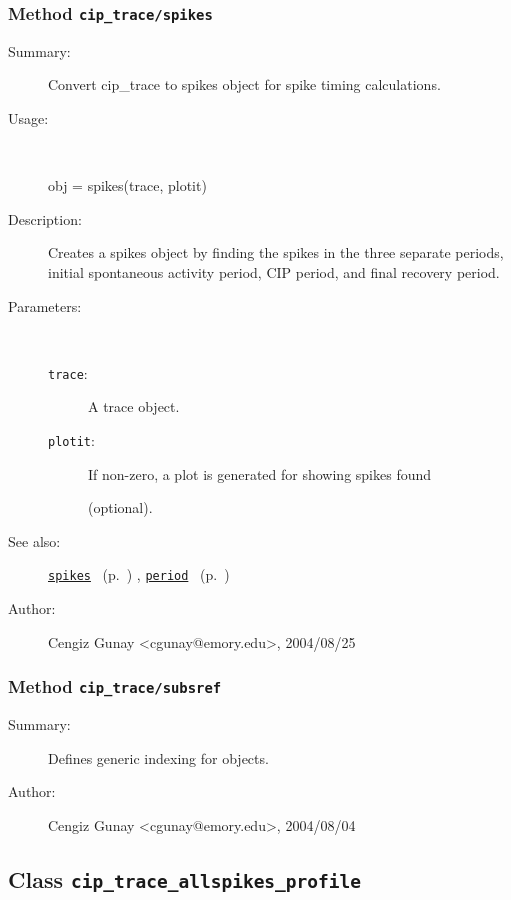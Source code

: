 \subsubsection[Method \texttt{spikes}]{Method \texttt{cip\_trace/spikes}}%
%
\label{ref_cip_trace__spikes}%
\hypertarget{ref_cip_trace__spikes}{}%
\begin{description}
\item[Summary:]Convert cip\_trace to spikes object for spike timing calculations.
%
\item[Usage:]~%
\begin{lyxcode}%
obj = spikes(trace, plotit)
%
\end{lyxcode}%
%
\item[Description:]%
Creates a spikes object by finding the spikes in the three 
 separate periods, initial spontaneous activity period, CIP period, and
 final recovery period.
\item[Parameters:]~
\begin{description}%
\item[\texttt{trace}:]
 A trace object.
\item[\texttt{plotit}:]
 If non-zero, a plot is generated for showing spikes found

(optional).
\end{description}%
%
%
%
\item[See also:]%
\hyperlink{ref_spikes}{\texttt{spikes}}%
\ (p.~\pageref{ref_spikes})%
%
, \hyperlink{ref_period}{\texttt{period}}%
\ (p.~\pageref{ref_period})%
%
%
\item[Author:]%
Cengiz Gunay <cgunay@emory.edu>, 2004/08/25
%
\end{description}
\methodline%
\subsubsection[Method \texttt{subsref}]{Method \texttt{cip\_trace/subsref}}%
%
\label{ref_cip_trace__subsref}%
\hypertarget{ref_cip_trace__subsref}{}%
\begin{description}
\item[Summary:]Defines generic indexing for objects.
%
%
%
%
%
%
%
\item[Author:]%
Cengiz Gunay <cgunay@emory.edu>, 2004/08/04
%
\end{description}
\methodline%
\subsection{Class \texttt{cip\_trace\_allspikes\_profile}}%
%
\label{ref_cip_trace_allspikes_profile}%
\hypertarget{ref_cip_trace_allspikes_profile}{}%

